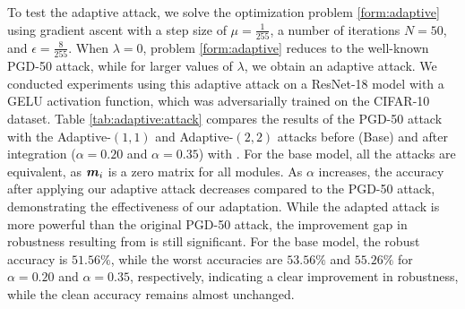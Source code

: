 \documentclass[conference]{IEEEtran}
\begin{document}
To test the adaptive attack, we solve the optimization problem \mbox{\eqref{form:adaptive}} using gradient ascent with a step size of $\mu = \frac{1}{255}$, a number of iterations $N = 50$, and $\epsilon = \frac{8}{255}$. When $\lambda = 0$, problem \mbox{\eqref{form:adaptive}} reduces to the well-known PGD-50 attack, while for larger values of $\lambda$, we obtain an adaptive attack. We conducted experiments using this adaptive attack on a ResNet-18 model with a GELU activation function, which was adversarially trained on the CIFAR-10 dataset. Table \mbox{\ref{tab:adaptive:attack}} compares the results of the PGD-50 attack with the Adaptive-$(1,1)$ and Adaptive-$(2,2)$ attacks before (Base) and after integration ($\alpha = 0.20$ and $\alpha = 0.35$) with \sys. For the base model, all the attacks are equivalent, as $\boldsymbol{m}_i$ is a zero matrix for all \sys modules. As $\alpha$ increases, the accuracy after applying our adaptive attack decreases compared to the PGD-50 attack, demonstrating the effectiveness of our adaptation. While the adapted attack is more powerful than the original PGD-50 attack, the improvement gap in robustness resulting from \sys is still significant. For the base model, the robust accuracy is $51.56\%$, while the worst accuracies are $53.56\%$ and $55.26\%$ for $\alpha = 0.20$ and $\alpha = 0.35$, respectively, indicating a clear improvement in robustness, while the clean accuracy remains almost unchanged.


\begin{table}[h]
\footnotesize
\caption{Clean, PGD-50 and Adaptive Attack accuracy for a ResNet-18 model with GELU activation over CIFAR-10 dataset before (Base) and after integration with \sys}
\renewcommand{\arraystretch}{1.3}
\label{tab:adaptive:attack}
\centering
\setlength\tabcolsep{2pt}
\end{table}
\end{document}
